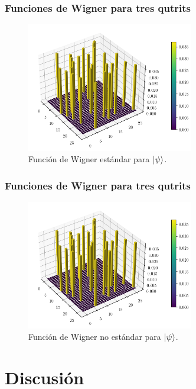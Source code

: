 \documentclass[10pt, spanish]{beamer}
\begin{document}
  \begin{frame}
    \frametitle{Funciones de Wigner para tres qutrits}

    \begin{figure}[h]
      \centering
      \includegraphics[width=0.65\textwidth]{
      imgs/wigner-standard-3-3-s1.png}
      \caption{Función de Wigner estándar para
      $\ket{\psi}$.}
      \label{fig:wigner-standard-3-3-s1}
    \end{figure}
  \end{frame}

  \begin{frame}
    \frametitle{Funciones de Wigner para tres qutrits}

    \begin{figure}[h]
      \centering
      \includegraphics[width=0.65\textwidth]{
      imgs/wigner-standard-3-3-s1.png}
      \caption{Función de Wigner no estándar para
      $\ket{\psi}$.}
      \label{fig:wigner-kantor-3-3-s1}
    \end{figure}
  \end{frame}

  
  \section{Discusión}
\end{document}
